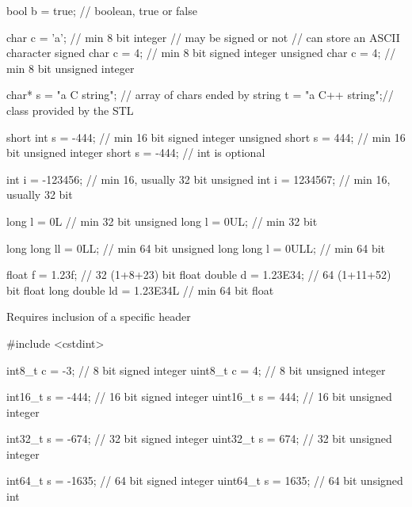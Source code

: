 \begin{frame}[fragile]
  \begin{cppcode}
    bool b = true;            // boolean, true or false

    char c = 'a';             // min 8 bit integer
                              // may be signed or not
                              // can store an ASCII character
    signed char c = 4;        // min 8 bit signed integer
    unsigned char c = 4;      // min 8 bit unsigned integer

    char* s = "a C string";   // array of chars ended by \0
    string t = "a C++ string";// class provided by the STL

    short int s = -444;       // min 16 bit signed integer
    unsigned short s = 444;   // min 16 bit unsigned integer
    short s = -444;           // int is optional
  \end{cppcode}
\end{frame}
\begin{frame}[fragile]
  \begin{cppcode}
    int i = -123456;          // min 16, usually 32 bit
    unsigned int i = 1234567; // min 16, usually 32 bit

    long l = 0L               // min 32 bit
    unsigned long l = 0UL;    // min 32 bit

    long long ll = 0LL;          // min 64 bit
    unsigned long long l = 0ULL; // min 64 bit

    float f = 1.23f;          // 32 (1+8+23) bit float
    double d = 1.23E34;       // 64 (1+11+52) bit float
    long double ld = 1.23E34L // min 64 bit float
  \end{cppcode}
\end{frame}

\begin{frame}[fragile]
  \alert{Requires inclusion of a specific header}
  \begin{cppcode}
    #include <cstdint>

    int8_t c = -3;     // 8 bit signed integer
    uint8_t c = 4;     // 8 bit unsigned integer

    int16_t s = -444;  // 16 bit signed integer
    uint16_t s = 444;  // 16 bit unsigned integer

    int32_t s = -674;  // 32 bit signed integer
    uint32_t s = 674;  // 32 bit unsigned integer

    int64_t s = -1635; // 64 bit signed integer
    uint64_t s = 1635; // 64 bit unsigned int
    \end{cppcode}
\end{frame}

